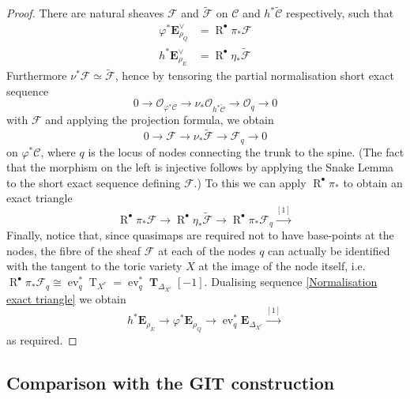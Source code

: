 \documentclass[11pt]{amsart}
\newcommand{\TT}{\operatorname{T}}
\newcommand{\OO}{\mathcal{O}}
\renewcommand{\to}{\rightarrow}
\newcommand{\EE}{\mathbf{E}}
\newcommand{\R}{\operatorname{R}^{\bullet}}
\newcommand{\ev}{\operatorname{ev}}
\theoremstyle{definition}
\theoremstyle{definition}
\begin{document}
\begin{proof}
There are natural sheaves $\mathcal{F}$ and $\tilde{\mathcal{F}}$ on $\mathcal{C}$ and $h^* \tilde{\mathcal{C}}$ respectively, such that
\begin{align*} \varphi^*\EE_{\rho_Q}^\vee & = \R \pi_* \mathcal{F} \\
h^* \EE_{\rho_E}^\vee & = \R \eta_* \tilde{\mathcal{F}} \end{align*}
Furthermore $\nu^*\mathcal{F}\simeq\tilde{\mathcal{F}}$, hence by tensoring the partial normalisation short exact sequence
\begin{equation*} 0 \to \OO_{\varphi^*{\mathcal{C}}} \to \nu_* \OO_{h^* \tilde{\mathcal{C}}} \to \OO_q \to 0 \end{equation*}
with $\mathcal{F}$ and applying the projection formula, we obtain
\begin{equation*} 0 \to \mathcal{F} \to \nu_* \tilde{\mathcal{F}} \to \mathcal{F}_q \to 0 \end{equation*}
on $\varphi^*\mathcal{C}$, where $q$ is the locus of nodes connecting the trunk to the spine. (The fact that the morphism on the left is injective follows by applying the Snake Lemma to the short exact sequence defining $\mathcal{F}$.) To this we can apply $\R \pi_*$ to obtain an exact triangle
\begin{equation} \label{Normalisation exact triangle} \R \pi_* \mathcal{F} \to \R \eta_* \tilde{\mathcal{F}} \to \R \pi_* \mathcal{F}_q \xrightarrow{[1]} \end{equation}
Finally, notice that, since quasimaps are required not to have base-points at the nodes, the fibre of the sheaf $\mathcal F$ at each of the nodes $q$ can actually be identified with the tangent to the toric variety $X$ at the image of the node itself, i.e. $\R \pi_* \mathcal{F}_q \cong \ev_q^* \TT_{X^r}= \ev_q^* \mathbf{\operatorname{T}}_{\Delta_{X^r}}[-1]$. Dualising sequence \eqref{Normalisation exact triangle} we obtain
\begin{equation*} h^* \EE_{\rho_E} \to \varphi^* \EE_{\rho_Q} \to \ev_q^* \EE_{\Delta_{X^r}} \xrightarrow{[1]} \end{equation*}
as required. \end{proof}
\subsection{Comparison with the GIT construction} \label{Section comparison with GIT construction}
\end{document}
